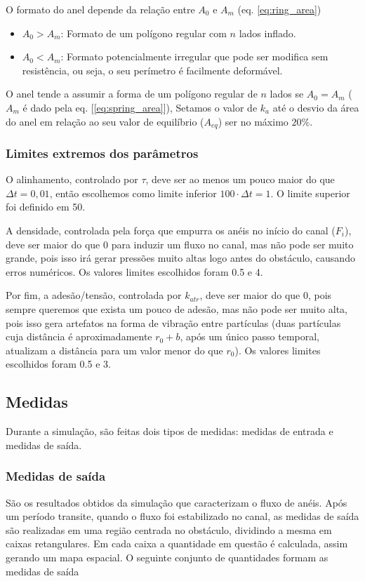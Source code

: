 \documentclass{article}
\theoremstyle{definition}
\begin{document}
O formato do anel depende da relação entre $A_0$ e $A_m$ (eq. \ref{eq:ring_area})
\begin{itemize}
    \item $A_0 > A_m$: Formato de um polígono regular com $n$ lados inflado.
    \item $A_0 < A_m$: Formato potencialmente irregular que pode ser modifica sem resistência, ou seja, o seu perímetro é facilmente deformável.
\end{itemize}


O anel tende a assumir a forma de um polígono regular de $n$ lados se $A_0 = A_m$ ($A_m$ é dado pela eq. [\ref{eq:spring_area}]), 
Setamos o valor de $k_a$ até o desvio da área do anel em relação ao seu valor de equilíbrio ($A_{eq}$) ser no máximo $20\%$.

\subsubsection{Limites extremos dos parâmetros}
O alinhamento, controlado por $\tau$, deve ser ao menos um pouco maior do que $\Delta t = 0,01$, então escolhemos como limite inferior $100 \cdot \Delta t = 1$. O limite superior foi definido em 50.

A densidade, controlada pela força que empurra os anéis no início do canal ($F_i$), deve ser maior do que 0 para induzir um fluxo no canal, mas não pode ser muito grande, pois isso irá gerar pressões muito altas logo antes do obstáculo, causando erros numéricos. Os valores limites escolhidos foram 0.5 e 4.

Por fim, a adesão/tensão, controlada por $k_{atr}$, deve ser maior do que 0, pois sempre queremos que exista um pouco de adesão, mas não pode ser muito alta, pois isso gera artefatos na forma de vibração entre partículas (duas partículas cuja distância é aproximadamente $r_0 + b$, após um único passo temporal, atualizam a distância para um valor menor do que $r_0$). Os valores limites escolhidos foram 0.5 e 3.

\subsection{Medidas}
Durante a simulação, são feitas dois tipos de medidas: medidas de entrada e medidas de saída.

\subsubsection{Medidas de saída}
São os resultados obtidos da simulação que caracterizam o fluxo de anéis. Após um período transite, quando o fluxo foi estabilizado no canal, as medidas de saída são realizadas em uma região centrada no obstáculo, dividindo a mesma em caixas retangulares. Em cada caixa a quantidade em questão é calculada, assim gerando um mapa espacial. O seguinte conjunto de quantidades formam as medidas de saída
\end{document}
